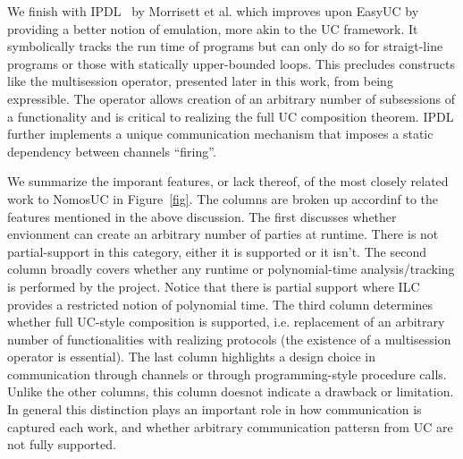 We finish with IPDL~\cite{ipdl} by Morrisett et al. which improves upon EasyUC by providing a better notion of emulation, more akin to the UC framework.
It symbolically tracks the run time of programs but can only do so for straigt-line programs or those with statically upper-bounded loops.
This precludes constructs like the multisession operator, presented later in this work, from being expressible. 
The operator allows creation of an arbitrary number of subsessions of a functionality and is critical to realizing the full UC composition theorem.
IPDL further implements a unique communication mechanism that imposes a static dependency between channels ``firing''.

We summarize the imporant features, or lack thereof, of the most closely related work to NomosUC in Figure~\ref{fig}.
The columns are broken up accordinf to the features mentioned in the above discussion.
The first discusses whether envionment can create an arbitrary number of parties at runtime. There is not partial-support in this category, either it is supported or it isn't.
The second column broadly covers whether any runtime or polynomial-time analysis/tracking is performed by the project. Notice that there is partial support where ILC provides a restricted notion of polynomial time.
The third column determines whether full UC-style composition is supported, i.e. replacement of an arbitrary number of functionalities with realizing protocols (the existence of a multisession operator is essential). 
The last column highlights a design choice in communication through channels or through programming-style procedure calls.
Unlike the other columns, this column doesnot indicate a drawback or limitation.
In general this distinction plays an important role in how communication is captured each work, and whether arbitrary communication pattersn from UC are not fully supported.

